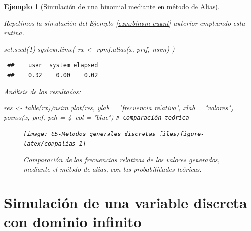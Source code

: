 \documentclass[
]{book}
\newenvironment{Shaded}{\begin{snugshade}}{\end{snugshade}}
\newcommand{\AttributeTok}[1]{\textcolor[rgb]{0.77,0.63,0.00}{#1}}
\newcommand{\CommentTok}[1]{\textcolor[rgb]{0.56,0.35,0.01}{\textit{#1}}}
\newcommand{\DecValTok}[1]{\textcolor[rgb]{0.00,0.00,0.81}{#1}}
\newcommand{\FunctionTok}[1]{\textcolor[rgb]{0.00,0.00,0.00}{#1}}
\newcommand{\NormalTok}[1]{#1}
\newcommand{\OtherTok}[1]{\textcolor[rgb]{0.56,0.35,0.01}{#1}}
\newcommand{\SpecialCharTok}[1]{\textcolor[rgb]{0.00,0.00,0.00}{#1}}
\newcommand{\StringTok}[1]{\textcolor[rgb]{0.31,0.60,0.02}{#1}}
\theoremstyle{break}
\newtheorem{example}{Ejemplo}[chapter]
\theoremstyle{nonumberplain}
\renewcommand{\CommentTok}[1]{\textcolor[rgb]{0.41,0.41,0.41}{\texttt{#1}}}
\begin{document}
\begin{example}[Simulación de una binomial mediante en método de Alias]
\protect\hypertarget{exm:binom-alias}{}\label{exm:binom-alias}

Repetimos la simulación del Ejemplo \ref{exm:binom-cuant} anterior empleando esta rutina.

\begin{Shaded}
\begin{Highlighting}[]
\FunctionTok{set.seed}\NormalTok{(}\DecValTok{1}\NormalTok{)}
\FunctionTok{system.time}\NormalTok{( rx }\OtherTok{\textless{}{-}} \FunctionTok{rpmf.alias}\NormalTok{(x, pmf, nsim) )}
\end{Highlighting}
\end{Shaded}

\begin{verbatim}
 ##    user  system elapsed 
 ##    0.02    0.00    0.02
\end{verbatim}

Análisis de los resultados:

\begin{Shaded}
\begin{Highlighting}[]
\NormalTok{res }\OtherTok{\textless{}{-}} \FunctionTok{table}\NormalTok{(rx)}\SpecialCharTok{/}\NormalTok{nsim}
\FunctionTok{plot}\NormalTok{(res, }\AttributeTok{ylab =} \StringTok{"frecuencia relativa"}\NormalTok{, }\AttributeTok{xlab =} \StringTok{"valores"}\NormalTok{)}
\FunctionTok{points}\NormalTok{(x, pmf, }\AttributeTok{pch =} \DecValTok{4}\NormalTok{, }\AttributeTok{col =} \StringTok{"blue"}\NormalTok{)  }\CommentTok{\# Comparación teórica}
\end{Highlighting}
\end{Shaded}

\begin{figure}[!htb]

{\centering \texttt{[image: 05-Metodos\_generales\_discretas\_files/figure-latex/compalias-1]} 

}

\caption{Comparación de las frecuencias relativas de los valores generados, mediante el método de alias, con las probabilidades teóricas.}\label{fig:compalias}
\end{figure}

\end{example}

\hypertarget{simulaciuxf3n-de-una-variable-discreta-con-dominio-infinito}{%
\section{Simulación de una variable discreta con dominio infinito}\label{simulaciuxf3n-de-una-variable-discreta-con-dominio-infinito}}
\end{document}
